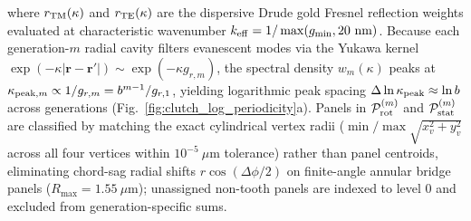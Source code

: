 \documentclass[pdflatex,sn-nature]{sn-jnl}
\begin{document}
where $r_{\rm TM}(\kappa)$ and $r_{\rm TE}(\kappa)$ are the dispersive Drude gold Fresnel reflection weights evaluated at characteristic wavenumber $k_{\rm eff} = 1/\max(g_{\rm min}, 20\text{ nm})$. Because each generation-$m$ radial cavity filters evanescent modes via the Yukawa kernel $\exp(-\kappa |\mathbf{r}-\mathbf{r}'|) \sim \exp(-\kappa g_{r,m})$, the spectral density $w_m(\kappa)$ peaks at $\kappa_{{\rm peak},m} \propto 1/g_{r,m} = b^{m-1}/g_{r,1}$, yielding logarithmic peak spacing $\Delta\ln\kappa_{\rm peak} \approx \ln b$ across generations (Fig.~\ref{fig:clutch_log_periodicity}a). Panels in $\mathcal{P}_{\rm rot}^{(m)}$ and $\mathcal{P}_{\rm stat}^{(m)}$ are classified by matching the exact cylindrical vertex radii ($\min/\max \sqrt{x_v^2 + y_v^2}$ across all four vertices within $10^{-5}\ \mu\text{m}$ tolerance) rather than panel centroids, eliminating chord-sag radial shifts $r\cos(\Delta\phi/2)$ on finite-angle annular bridge panels ($R_{\max} = 1.55\ \mu\text{m}$); unassigned non-tooth panels are indexed to level $0$ and excluded from generation-specific sums.
\end{document}
